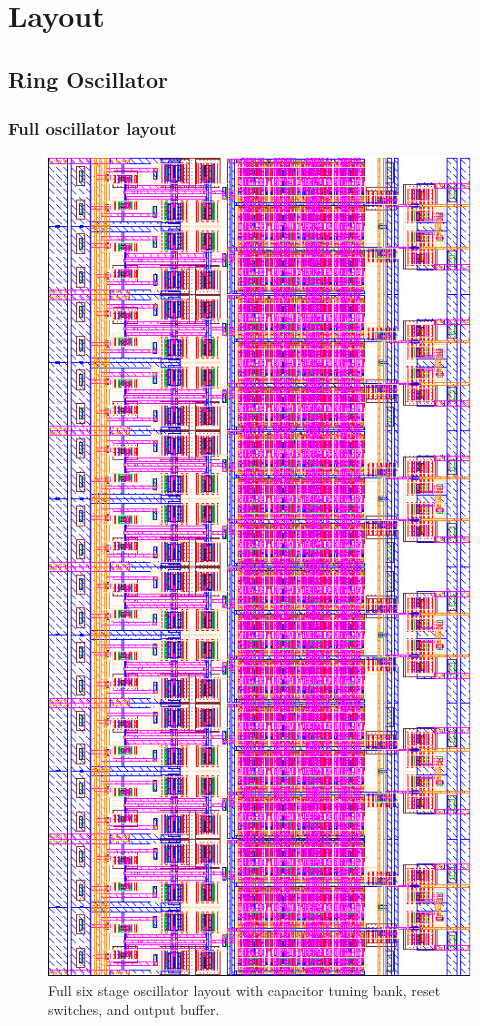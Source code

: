 	\appendix

	\section{Layout}
		\subsection{Ring Oscillator}
			\subsubsection{Full oscillator layout}
				\begin{figure}[htb!]
				        \centering
				        \includegraphics[height=0.75\textheight, angle=0]{./figs/layout/layout_osc}
				    \caption{Full six stage oscillator layout with capacitor tuning bank, reset switches, and output buffer.}
				\end{figure}
			\FloatBarrier\pagebreak
